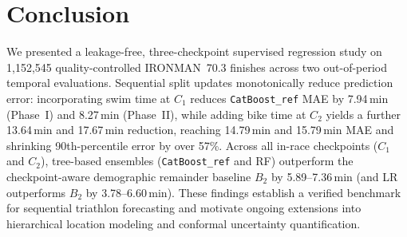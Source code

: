 \documentclass[11pt,a4paper]{article}
\begin{document}
\section{Conclusion}

We presented a leakage-free, three-checkpoint supervised regression
study on 1{,}152{,}545 quality-controlled IRONMAN~70.3 finishes across
two out-of-period temporal evaluations. Sequential split updates
monotonically reduce prediction error: incorporating swim time at
$C_1$ reduces \texttt{CatBoost\_ref} MAE by 7.94\,min (Phase~I) and
8.27\,min (Phase~II), while adding bike time at $C_2$ yields a further
13.64\,min and 17.67\,min reduction, reaching 14.79\,min and
15.79\,min MAE and shrinking 90th-percentile error by over 57\%. Across
all in-race checkpoints ($C_1$ and $C_2$), tree-based ensembles
(\texttt{CatBoost\_ref} and RF) outperform the checkpoint-aware
demographic remainder baseline $B_2$ by 5.89--7.36\,min (and LR
outperforms $B_2$ by 3.78--6.60\,min).
These findings establish a verified benchmark for sequential triathlon
forecasting and motivate ongoing extensions into hierarchical location
modeling and conformal uncertainty quantification.
\end{document}
